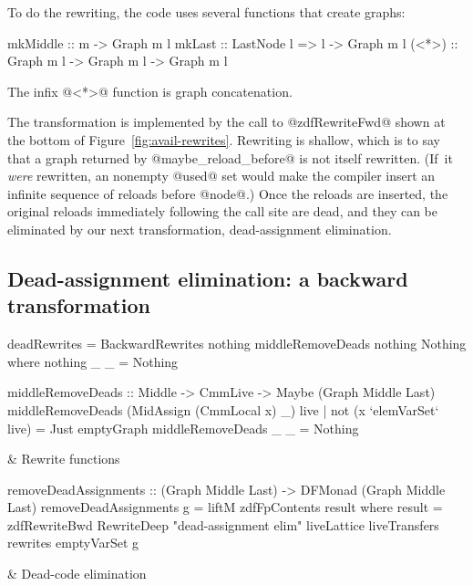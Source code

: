\documentclass[blockstyle,preprint,nocopyrightspace]{sigplanconf}
\newcommand\seclabel[1]{\label{sec:#1}}
\newcommand\figref[1]{Figure~\ref{fig:#1}}
\newcommand\figlabel[1]{\label{fig:#1}}
\begin{document}
To do the rewriting, the code uses several functions that create
graphs:
\begin{code}
mkMiddle ::               m -> Graph m l
mkLast   :: LastNode l => l -> Graph m l
(<*>)    :: Graph m l -> Graph m l -> Graph m l
\end{code}
The infix @<*>@ function is graph concatenation.

The transformation is implemented by the call to @zdfRewriteFwd@
shown at the bottom of \figref{avail-rewrites}.
Rewriting is shallow, which is to say that a graph returned by
@maybe_reload_before@ is not itself rewritten.
(If~it \emph{were} rewritten, an nonempty @used@ set would make the
compiler insert an infinite sequence of reloads before @node@.)
Once the reloads are inserted, the original reloads immediately
following the call site are dead, and they can be eliminated by our
next transformation, dead-assignment elimination.

\subsection{Dead-assignment elimination: a backward transformation}

\seclabel{bwd-rewrite}

\begin{figure*}
\begin{codetable}
\T\begin{code}
deadRewrites = BackwardRewrites nothing middleRemoveDeads nothing Nothing
  where nothing _ _ = Nothing

middleRemoveDeads :: Middle -> CmmLive -> Maybe (Graph Middle Last)
middleRemoveDeads (MidAssign (CmmLocal x) _) live
    | not (x `elemVarSet` live) = Just emptyGraph
middleRemoveDeads _ _ = Nothing
\end{code}\B
& Rewrite \mbox{functions}\\
\hline

\T\begin{code}
removeDeadAssignments :: (Graph Middle Last) -> DFMonad (Graph Middle Last)
removeDeadAssignments g = liftM zdfFpContents result
     where result = zdfRewriteBwd RewriteDeep "dead-assignment elim"
                                  liveLattice liveTransfers rewrites emptyVarSet g
\end{code}%
& \mbox{Dead-code} elimination\\
\end{codetable}
\caption{Dead-assignment elimination, which relies on the analysis of
\figref{liveness}} 
\figlabel{dead-elim}
\end{figure*}
\end{document}
